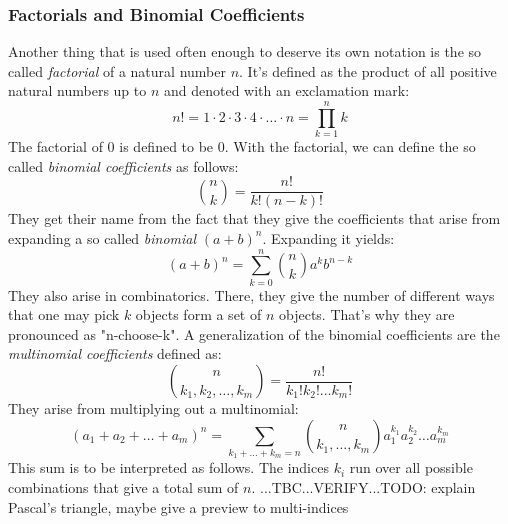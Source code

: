 


\subsubsection{Factorials and Binomial Coefficients}
Another thing that is used often enough to deserve its own notation is the so called \emph{factorial} of a natural number $n$. It's defined as the product of all positive natural numbers up to $n$ and denoted with an exclamation mark:
\begin{equation}
 n! = 1 \cdot 2 \cdot 3 \cdot 4 \cdot \ldots \cdot n = \prod_{k=1}^{n} k
\end{equation}
The factorial of $0$ is defined to be $0$. With the factorial, we can define the so called \emph{binomial coefficients} as follows:
\begin{equation}
\label{Eq:BinomialCoeffs}
 \binom{n}{k} = \frac{n!}{k! (n-k)!}
\end{equation}
They get their name from the fact that they give the coefficients that arise from expanding a so called \emph{binomial} $(a+b)^n$. Expanding it yields:
\begin{equation}
(a+b)^n = \sum_{k=0}^{n} \binom{n}{k} a^k b^{n-k}
\end{equation}
They also arise in combinatorics. There, they give the number of different ways that one may pick $k$ objects form a set of $n$ objects. That's why they are pronounced as "n-choose-k". A generalization of the binomial coefficients are the \emph{multinomial coefficients} defined as:
\begin{equation}
\label{Eq:MultinomialCoeffs}
 \binom{n}{k_1,k_2,\ldots,k_m} = \frac{n!}{k_1! k_2! \ldots k_m!}
\end{equation}
They arise from multiplying out a multinomial:
\begin{equation}
(a_1 + a_2 + \ldots + a_m)^n 
= \sum_{k_1+\ldots+k_m = n} \binom{n}{k_1, \ldots, k_m} a_1^{k_1} a_2^{k_2} \ldots a_m^{k_m}
\end{equation}
This sum is to be interpreted as follows. The indices $k_i$ run over all possible combinations that give a total sum of $n$. ...TBC...VERIFY...TODO: explain Pascal's triangle, maybe give a preview to multi-indices


